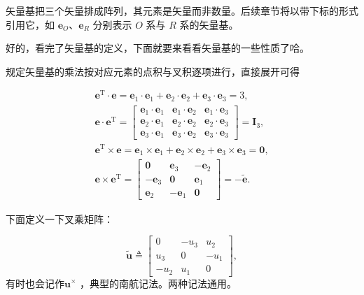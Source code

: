 \begin{remark}
	矢量基把三个矢量排成阵列，其元素是矢量而非数量。后续章节将以带下标的形式引用它，如 $\boldsymbol{e}_O$、$\boldsymbol{e}_R$ 分别表示 $O$ 系与 $R$ 系的矢量基。
\end{remark}

好的，看完了矢量基的定义，下面就要来看看矢量基的一些性质了哈。

\begin{property}[矢量基的运算性质]
	规定矢量基的乘法按对应元素的点积与叉积逐项进行，直接展开可得
	
	\begin{gather*}
		\boldsymbol{e}^{\mathrm{T}} \cdot \boldsymbol{e}
		= \mathbf{e}_1\cdot\mathbf{e}_1 + \mathbf{e}_2\cdot\mathbf{e}_2 + \mathbf{e}_3\cdot\mathbf{e}_3 = 3,
		\\[2pt]
		\boldsymbol{e} \cdot \boldsymbol{e}^{\mathrm{T}}
		=
		\begin{bmatrix}
			\mathbf{e}_1\!\cdot\!\mathbf{e}_1 & \mathbf{e}_1\!\cdot\!\mathbf{e}_2 & \mathbf{e}_1\!\cdot\!\mathbf{e}_3 \\
			\mathbf{e}_2\!\cdot\!\mathbf{e}_1 & \mathbf{e}_2\!\cdot\!\mathbf{e}_2 & \mathbf{e}_2\!\cdot\!\mathbf{e}_3 \\
			\mathbf{e}_3\!\cdot\!\mathbf{e}_1 & \mathbf{e}_3\!\cdot\!\mathbf{e}_2 & \mathbf{e}_3\!\cdot\!\mathbf{e}_3
		\end{bmatrix}
		= \boldsymbol{I}_3,
		\\[2pt]
		\boldsymbol{e}^{\mathrm{T}} \times \boldsymbol{e}
		= \mathbf{e}_1\times\mathbf{e}_1 + \mathbf{e}_2\times\mathbf{e}_2 + \mathbf{e}_3\times\mathbf{e}_3 = \boldsymbol{0},
		\\[2pt]
		\boldsymbol{e} \times \boldsymbol{e}^{\mathrm{T}}
		=
		\begin{bmatrix}
			\boldsymbol{0} & \mathbf{e}_3 & -\mathbf{e}_2 \\
			-\mathbf{e}_3 & \boldsymbol{0} & \mathbf{e}_1 \\
			\mathbf{e}_2 & -\mathbf{e}_1 & \boldsymbol{0}
		\end{bmatrix}
		= -\tilde{\boldsymbol{e}}.
	\end{gather*}
\end{property}

下面定义一下叉乘矩阵：
\begin{definition}[叉乘矩阵]
	$$
	\tilde{\boldsymbol{u}} \triangleq
	\begin{bmatrix}
		0 & -u_3 & u_2 \\
		u_3 & 0 & -u_1 \\
		-u_2 & u_1 & 0
	\end{bmatrix},
	$$
	有时也会记作$\boldsymbol{u}^{\times}$ ，典型的南航记法。两种记法通用。
\end{definition}

